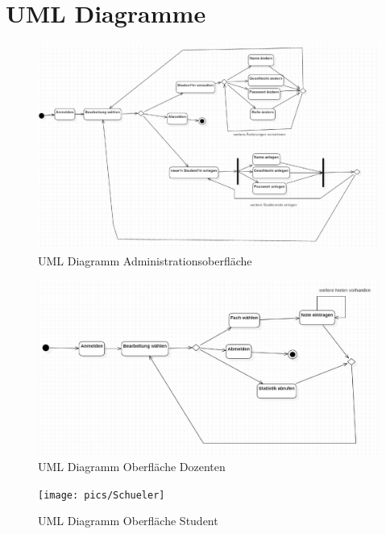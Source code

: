 \documentclass[12pt,a4paper,parskip]{scrreprt}
\begin{document}
\section{UML Diagramme}
\begin{figure}[!hbtp]%
\centering
\includegraphics[width=1\linewidth]{pics/AdminE}
\caption[Admin]{UML Diagramm Administrationsoberfläche}
\label{fig:AdminE}
\end{figure}
\begin{figure}[!hbtp]%
\centering
\includegraphics[width=1\linewidth]{pics/DozentIn}
\caption[Oberfläche Dozenten]{UML Diagramm Oberfläche Dozenten}
\label{fig:DozentIn}
\end{figure}
\begin{figure}
\centering
\texttt{[image: pics/Schueler]}
\caption[Oberfläche Student]{UML Diagramm Oberfläche Student}
\label{fig:Schueler}
\end{figure}
\end{document}
